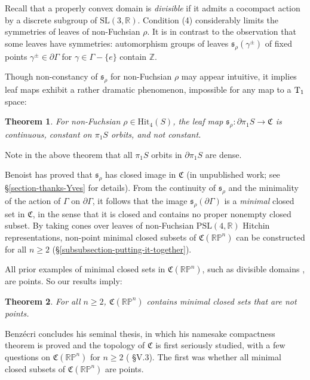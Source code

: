 \documentclass[12pt,a4paper]{amsart}
\newcommand{\bbR}{\mathbb R}
\newcommand{\RP}{\mathbb R \mathbb P}
\theoremstyle{definition}
\theoremstyle{plain}
\newtheorem{theorem}{Theorem}[section]
\numberwithin{equation}{section}
\begin{document}
Recall that a properly convex domain is \textit{divisible} if it admits a cocompact action by a discrete subgroup of $\text{SL}(3,\bbR)$. Condition (4) considerably limits the symmetries of leaves of non-Fuchsian $\rho$. It is in contrast to the observation that some leaves have symmetries: automorphism groups of leaves $\mathfrak{s}_\rho(\gamma^\pm)$ of fixed points $\gamma^\pm \in \partial \Gamma$ for $\gamma \in \Gamma - \{e\}$ contain $\mathbb{Z}$.

Though non-constancy of $\mathfrak{s}_\rho$ for non-Fuchsian $\rho$ may appear intuitive, it implies leaf maps exhibit a rather dramatic phenomenon, impossible for any map to a ${\rm T}_1$ space: \begin{theorem}\label{headline-theorem-wild-pathology}
    For non-Fuchsian {\rm{$\rho \in \text{Hit}_4(S)$}}, the leaf map $\mathfrak{s}_\rho: \partial \pi_1 S \to \mathfrak{C}$ is continuous, constant on $\pi_1S$ orbits, and not constant.
\end{theorem}

Note in the above theorem that all $\pi_1S$ orbits in $\partial \pi_1 S$ are dense.

Benoist has proved that $\mathfrak{s}_\rho$ has closed image in $\mathfrak{C}$ (in unpublished work; see \S \ref{section-thanks-Yves} for details). From the continuity of $\mathfrak{s}_\rho$ and the minimality of the action of $\Gamma$ on $\partial \Gamma$, it follows that the image $\mathfrak{s}_\rho(\partial \Gamma)$ is a \textit{minimal} closed set in $\mathfrak{C}$, in the sense that it is closed and contains no proper nonempty closed subset. By taking cones over leaves of non-Fuchsian $\text{PSL}(4,\bbR)$ Hitchin representations, non-point minimal closed subsets of $\mathfrak{C}(\RP^n)$ can be constructed for all $n \geq 2$ (\S \ref{subsubsection-putting-it-together}).

All prior examples of minimal closed sets in $\mathfrak{C}(\RP^n)$, such as divisible domains \cite{benzecri1960thesis}, are points. So our results imply:

\begin{theorem}\label{thm-solves-benzecri}
    For all $n \geq 2$, $\mathfrak{C}(\RP^n)$ contains minimal closed sets that are not points.
\end{theorem}

Benz\'ecri concludes his seminal thesis, in which his namesake compactness theorem is proved and the topology of $\mathfrak{C}$ is first seriously studied, with a few questions on $\mathfrak{C}(\RP^n)$ for $n \geq 2$ (\cite{benzecri1960thesis} \S V.3). The first was whether all minimal closed subsets of $\mathfrak{C}(\RP^n)$ are points.
\end{document}
